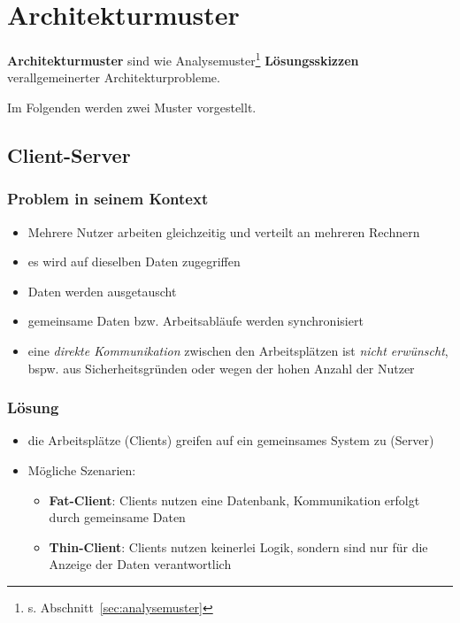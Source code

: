 \section{Architekturmuster}\label{sec:architekturmuster}

\textbf{Architekturmuster} sind wie Analysemuster\footnote{
    s. Abschnitt~\ref{sec:analysemuster}
} \textbf{Lösungsskizzen} verallgemeinerter Architekturprobleme.

Im Folgenden werden zwei Muster vorgestellt.

\subsection{Client-Server}

\subsubsection*{Problem in seinem Kontext}
\begin{itemize}
    \item Mehrere Nutzer arbeiten gleichzeitig und verteilt an mehreren Rechnern
    \item es wird auf dieselben Daten zugegriffen
    \item Daten werden ausgetauscht
    \item gemeinsame Daten bzw. Arbeitsabläufe werden synchronisiert
    \item eine \textit{direkte Kommunikation} zwischen den Arbeitsplätzen ist \textit{nicht erwünscht}, bspw. aus Sicherheitsgründen oder wegen der hohen Anzahl der Nutzer
\end{itemize}


\subsubsection*{Lösung}

\begin{itemize}
    \item die Arbeitsplätze (Clients) greifen auf ein gemeinsames System zu (Server)
    \item Mögliche Szenarien:
        \begin{itemize}
            \item \textbf{Fat-Client}: Clients nutzen eine Datenbank, Kommunikation erfolgt durch gemeinsame Daten
            \item \textbf{Thin-Client}: Clients nutzen keinerlei Logik, sondern sind nur für die Anzeige der Daten verantwortlich
        \end{itemize}
\end{itemize}

